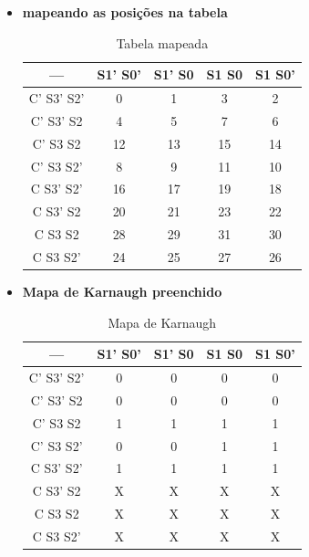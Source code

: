 \documentclass[11pt]{report}         %
\begin{document}
\begin{itemize}

\item \textbf{mapeando as posições na tabela}


\begin{table}[h!]
    \centering
    
    \caption{Tabela mapeada}
    
    \begin{tabular}{|c|c|c|c|c|}

      \hline
      \textbf{---} & \textbf{S1' S0'} & \textbf{S1' S0} & \textbf{S1 S0} & \textbf{S1 S0'}\\ \hline
      C' S3' S2' & 0 & 1 & 3 & 2       \\ \hline
      C' S3' S2  & 4 & 5 & 7 & 6       \\ \hline
      C' S3 S2   & 12 & 13 & 15 & 14   \\ \hline
      C' S3 S2'  & 8 & 9 & 11 & 10     \\ \hline
      C S3' S2'  & 16 & 17 & 19 & 18   \\ \hline
      C S3' S2   & 20 & 21 & 23 & 22   \\ \hline
      C S3 S2    & 28 & 29 & 31 & 30   \\ \hline
      C S3 S2'   & 24 & 25 & 27 & 26   \\ \hline
      
    \end{tabular}

\end{table}

\newpage

\item \textbf{Mapa de Karnaugh preenchido}

\begin{table}[h!]
    \centering
    
    \caption{Mapa de Karnaugh}
    
    \begin{tabular}{|c|c|c|c|c|}

      \hline
      \textbf{---} & \textbf{S1' S0'} & \textbf{S1' S0} & \textbf{S1 S0} & \textbf{S1 S0'}\\ \hline
      C' S3' S2' & 0 & 0 & 0 & 0 \\ \hline
      C' S3' S2  & 0 & 0 & 0 & 0 \\ \hline
      C' S3 S2   & 1 & 1 & 1 & 1 \\ \hline
      C' S3 S2'  & 0 & 0 & 1 & 1 \\ \hline
      C S3' S2'  & 1 & 1 & 1 & 1 \\ \hline
      C S3' S2   & X & X & X & X \\ \hline
      C S3 S2    & X & X & X & X \\ \hline
      C S3 S2'   & X & X & X & X \\ \hline
      

\end{tabular}
\end{table}
\end{itemize}
\end{document}
